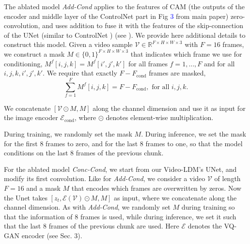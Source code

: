 The ablated model \textit{Add-Cond} applies to the features of CAM (\ie the outputs of the encoder and middle layer of the ControlNet part in Fig \textcolor{blue}{3} from main paper) zero-convolution, 
and uses addition to fuse it with the features of the skip-connection of the UNet (similar to ControlNet \cite{controlnet})  (see ). 
We provide here additional details to construct this model.
Given a video sample $\mathcal{V} \in \mathbb{R}^{F \times H \times W \times 3}$ with $F = 16$ frames, we construct  a  mask $M\in \{0,1\}^{F \times H \times W \times 3}$ that indicates which frame we use for conditioning, \ie $M^{f}[i,j,k] = M^{f}[i',j',k']$ for all frames $f = 1,\ldots,F$ and for all $i,j,k,i',j',k'$. We require that exactly $F-F_{\mathrm{cond}}$ frames are masked, \ie 
\begin{equation}
    \sum_{f=1}^{F} M^{f}[i,j,k] = F-F_{\mathrm{cond}}, \text{ for all } i,j,k.
\end{equation}

We concatenate $[\mathcal{V} \odot M,M]$ along the channel dimension and use it as input for the image encoder $\mathcal{E}_{\mathrm{cond}}$, where  $\odot$ denotes element-wise multiplication.

During training, we randomly set the mask $M$. During inference, we set the mask for the first $8$ frames to zero, and for the last $8$ frames to one, so that the model conditions on the last $8$ frames of the previous chunk.

For the ablated model \textit{Conc-Cond}, we start from our Video-LDM's UNet, and modify its first convolution. 
Like for \textit{Add-Cond}, we consider a video $\mathcal{V}$ of length $F=16$ and a mask $M$ that encodes which frames are overwritten by zeros. Now the Unet takes $[z_t, \mathcal{E}(\mathcal{V}) \odot M,M]$ as input, where we concatenate along the channel dimension. 
As with \textit{Add-Cond}, we randomly set $M$ during training so that the information of $8$ frames is used, while during inference, we set it such that the last $8$ frames of the previous chunk are used.  Here $\mathcal{E}$ denotes the VQ-GAN encoder 
(see Sec. \textcolor{linkblue}{3}). 




